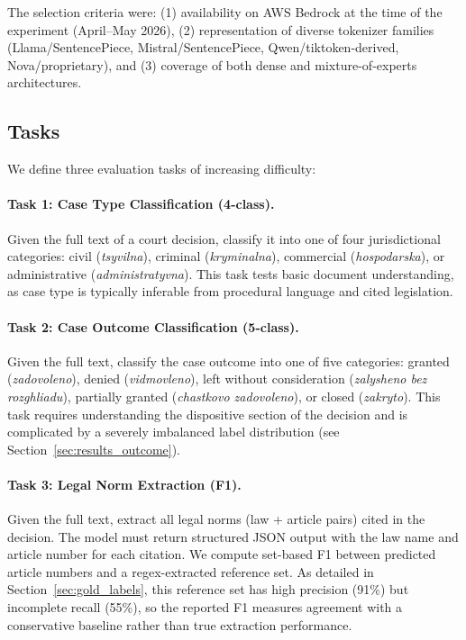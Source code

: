 \documentclass[11pt,a4paper]{article}
\begin{document}
The selection criteria were: (1) availability on AWS Bedrock at the time of the experiment (April--May 2026), (2) representation of diverse tokenizer families (Llama/SentencePiece, Mistral/SentencePiece, Qwen/tiktoken-derived, Nova/proprietary), and (3) coverage of both dense and mixture-of-experts architectures.

\subsection{Tasks}
\label{sec:tasks}

We define three evaluation tasks of increasing difficulty:

\paragraph{Task 1: Case Type Classification (4-class).}
Given the full text of a court decision, classify it into one of four jurisdictional categories: civil (\textit{tsyvilna}), criminal (\textit{kryminalna}), commercial (\textit{hospodarska}), or administrative (\textit{administratyvna}). This task tests basic document understanding, as case type is typically inferable from procedural language and cited legislation.

\paragraph{Task 2: Case Outcome Classification (5-class).}
Given the full text, classify the case outcome into one of five categories: granted (\textit{zadovoleno}), denied (\textit{vidmovleno}), left without consideration (\textit{zalysheno bez rozghliadu}), partially granted (\textit{chastkovo zadovoleno}), or closed (\textit{zakryto}). This task requires understanding the dispositive section of the decision and is complicated by a severely imbalanced label distribution (see Section~\ref{sec:results_outcome}).

\paragraph{Task 3: Legal Norm Extraction (F1).}
Given the full text, extract all legal norms (law + article pairs) cited in the decision. The model must return structured JSON output with the law name and article number for each citation. We compute set-based F1 between predicted article numbers and a regex-extracted reference set. As detailed in Section~\ref{sec:gold_labels}, this reference set has high precision (91\%) but incomplete recall (55\%), so the reported F1 measures agreement with a conservative baseline rather than true extraction performance.
\end{document}
